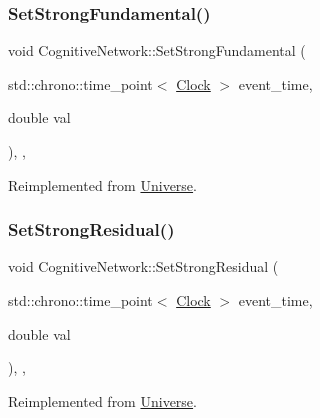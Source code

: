 \subsubsection{\texorpdfstring{Set\+Strong\+Fundamental()}{SetStrongFundamental()}}
{\footnotesize\ttfamily void Cognitive\+Network\+::\+Set\+Strong\+Fundamental (\begin{DoxyParamCaption}\item[{std\+::chrono\+::time\+\_\+point$<$ \mbox{\hyperlink{universe_8h_a0ef8d951d1ca5ab3cfaf7ab4c7a6fd80}{Clock}} $>$}]{event\+\_\+time,  }\item[{double}]{val }\end{DoxyParamCaption})\hspace{0.3cm}{\ttfamily [inline]}, {\ttfamily [final]}, {\ttfamily [virtual]}}



Reimplemented from \mbox{\hyperlink{classUniverse_aafec97a231126b71c73ac1258609a284}{Universe}}.

\mbox{\label{classCognitiveNetwork_a6f7210dd8c2786518329faa61b6e14d5}} 
\subsubsection{\texorpdfstring{Set\+Strong\+Residual()}{SetStrongResidual()}}
{\footnotesize\ttfamily void Cognitive\+Network\+::\+Set\+Strong\+Residual (\begin{DoxyParamCaption}\item[{std\+::chrono\+::time\+\_\+point$<$ \mbox{\hyperlink{universe_8h_a0ef8d951d1ca5ab3cfaf7ab4c7a6fd80}{Clock}} $>$}]{event\+\_\+time,  }\item[{double}]{val }\end{DoxyParamCaption})\hspace{0.3cm}{\ttfamily [inline]}, {\ttfamily [final]}, {\ttfamily [virtual]}}



Reimplemented from \mbox{\hyperlink{classUniverse_a1b2d6197ddf3d613cc30bd04d22ed8b7}{Universe}}.

\mbox{\label{classCognitiveNetwork_a9d2b7d1de9e7148a403fc15f7f3fd1bf}} 
